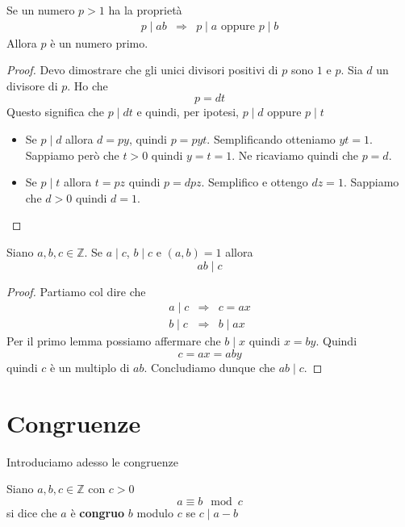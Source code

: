 \begin{lemma}
	Se un numero $p > 1$ ha la propriet\`a
	\begin{equation*}
		\begin{array}{lll}
			p \mid ab & \Rightarrow & p \mid a \text{ oppure } p \mid b
		\end{array}
	\end{equation*}
	Allora $p$ \`e un numero primo.
	\begin{proof}
		Devo dimostrare che gli unici divisori positivi di $p$ sono $1$ e $p$.
		Sia $d$ un divisore di $p$. Ho che
		\begin{equation*}
			p = dt
		\end{equation*}
		Questo significa che $p \mid dt$ e quindi, per ipotesi, $p \mid d$ oppure $p \mid t$
		\begin{itemize}
			\item Se $p \mid d$ allora $d = py$, quindi $p = pyt$. Semplificando otteniamo
			      $yt = 1$. Sappiamo per\`o che $t > 0$ quindi $y = t = 1$. Ne ricaviamo
			      quindi che $p = d$.
			\item Se $p \mid t$ allora $t = pz$ quindi $p = dpz$. Semplifico e ottengo
			      $dz = 1$. Sappiamo che $d > 0$ quindi $d = 1$.
		\end{itemize}
	\end{proof}
\end{lemma}

\begin{lemma}
	Siano $a, b, c \in \mathbb{Z}$. Se $a \mid c$, $b \mid c$ e $(a, b) = 1$ allora
	\begin{equation*}
		ab \mid c
	\end{equation*}
	\begin{proof}
		Partiamo col dire che
		\begin{equation*}
			\begin{array}{lll}
				a \mid c & \Rightarrow & c = ax    \\
				b \mid c & \Rightarrow & b \mid ax
			\end{array}
		\end{equation*}
		Per il primo lemma possiamo affermare che $b \mid x$ quindi $x = by$. Quindi
		\begin{equation*}
			c = ax = aby
		\end{equation*}
		quindi $c$ \`e un multiplo di $ab$. Concludiamo dunque che $ab \mid c$.
	\end{proof}
\end{lemma}

\section{Congruenze}
Introduciamo adesso le congruenze
\begin{defn}
	Siano $a, b, c \in \mathbb{Z}$ con $c > 0$
	\begin{equation*}
		a \equiv b \mod{c}
	\end{equation*}
	si dice che $a$ \`e \textbf{congruo} $b$ modulo $c$ se $c \mid a - b$
\end{defn}

